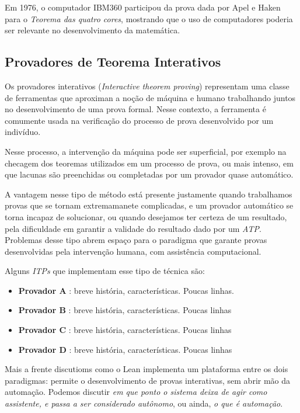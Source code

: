Em 1976, o computador IBM360 participou da prova dada por Apel e Haken para o \textit{Teorema das quatro cores}, mostrando que o uso de computadores poderia ser relevante no desenvolvimento da matemática.

\subsection{Provadores de Teorema Interativos}

Os provadores interativos (\textit{Interactive theorem proving}) representam uma classe de ferramentas que aproximan a noção de máquina e humano trabalhando juntos no desenvolvimento de uma prova formal.
Nesse contexto, a ferramenta é comumente usada na verificação do processo de prova desenvolvido por um indivíduo.

Nesse processo, a intervenção da máquina pode ser superficial, por exemplo na checagem dos teoremas utilizados em um processo de prova, ou mais intenso, em que lacunas são preenchidas ou completadas por um provador quase automático.

A vantagem nesse tipo de método está presente justamente quando trabalhamos provas que se tornam extremamanete complicadas, e um provador automático se torna incapaz de solucionar, ou quando desejamos ter certeza de um resultado, pela dificuldade em garantir a validade do resultado dado por um \textit{ATP}.
Problemas desse tipo abrem espaço para o paradigma que garante provas desenvolvidas pela intervenção humana, com assistência computacional.

Alguns \textit{ITPs} que implementam esse tipo de técnica são:

\begin{itemize}
    \item \textbf{Provador A} : breve história, características. Poucas linhas.
    \item \textbf{Provador B} : breve história, características. Poucas linhas
    \item \textbf{Provador C} : breve história, características. Poucas linhas
    \item \textbf{Provador D} : breve história, características. Poucas linhas
\end{itemize}

Mais a frente discutioms como o Lean implementa um plataforma entre os dois paradigmas: permite o desenvolvimento de provas interativas, sem abrir mão da automação.
Podemos discutir \textit{em que ponto o sistema deixa de agir como assistente, e passa a ser considerado autônomo}, ou ainda, \textit{o que é automação}.


